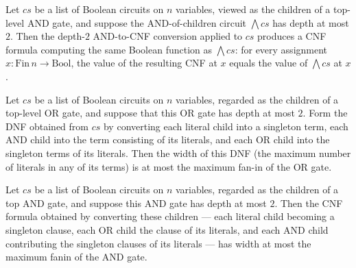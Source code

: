 \begin{lemma}
\label{LMN.depth2AndToCNF_eval}
\leanok
{}
Let $cs$ be a list of Boolean circuits on $n$ variables, viewed as the children of a
top-level AND gate, and suppose the AND-of-children circuit $\bigwedge cs$ has depth at
most $2$. Then the depth-$2$ AND-to-CNF conversion applied to $cs$ produces a CNF
formula computing the same Boolean function as $\bigwedge cs$: for every assignment $x :
\mathrm{Fin}\,n \to \mathrm{Bool}$, the value of the resulting CNF at $x$ equals the
value of $\bigwedge cs$ at $x$.
\end{lemma}

\begin{lemma}
\label{LMN.depth2OrToDNF_width_le}
\leanok
{}
Let $cs$ be a list of Boolean circuits on $n$ variables, regarded as the children of a
top-level OR gate, and suppose that this OR gate has depth at most $2$. Form the DNF
obtained from $cs$ by converting each literal child into a singleton term, each AND
child into the term consisting of its literals, and each OR child into the singleton
terms of its literals. Then the width of this DNF (the maximum number of literals in any
of its terms) is at most the maximum fan-in of the OR gate.
\end{lemma}

\begin{lemma}
\label{LMN.depth2AndToCNF_width_le}
\leanok
{}
Let $cs$ be a list of Boolean circuits on $n$ variables, regarded as the children of a
top AND gate, and suppose this AND gate has depth at most $2$. Then the CNF formula
obtained by converting these children — each literal child becoming a singleton clause,
each OR child the clause of its literals, and each AND child contributing the singleton
clauses of its literals — has width at most the maximum fanin of the AND gate.
\end{lemma}

